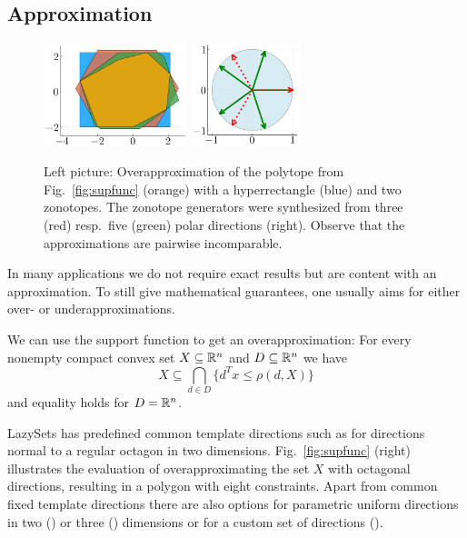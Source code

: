 \subsection{Approximation}\label{sec:approximation}

\begin{figure}
	\hfill
	\includegraphics[height=30mm]{img/overapproximate}
	\hfill
	\includegraphics[height=30mm]{img/polardirs}
	\hfill\
	\vspace*{1mm}
	\caption{Left picture: Overapproximation of the polytope from Fig.~\ref{fig:supfunc} (orange) with a hyperrectangle (blue) and two zonotopes. The zonotope generators were synthesized from three (red) resp.\ five (green) polar directions (right). Observe that the approximations are pairwise incomparable.}
	\label{fig:overapproximate}
\end{figure}

In many applications we do not require exact results but are content with an approximation. To still give mathematical guarantees, one usually aims for either over- or underapproximations.

We can use the support function to get an overapproximation: For every nonempty compact convex set $X \subseteq \mathbb{R}^n$ and $D \subseteq \mathbb{R}^n$ we have
\begin{equation*}
	X \subseteq \bigcap_{d \in D} \{d^T x \leq \rho(d, X)\}
\end{equation*}
and equality holds for $D = \mathbb{R}^n$.

\smallskip

LazySets has predefined common template directions such as  for directions normal to a regular octagon in two dimensions. Fig.~\ref{fig:supfunc} (right) illustrates the evaluation of overapproximating the set $X$ with octagonal directions, resulting in a polygon with eight constraints. Apart from common fixed template directions there are also options for parametric uniform directions in two () or three () dimensions or for a custom set of directions ().

